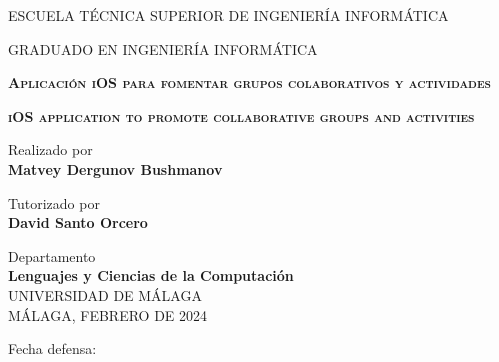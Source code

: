 \begin{titlepage}
    \selectfont
    
    \begin{center}
        {\large ESCUELA TÉCNICA SUPERIOR DE INGENIERÍA INFORMÁTICA}

        \vspace{0.1cm}
        {\large GRADUADO EN INGENIERÍA INFORMÁTICA}

        \vspace{2cm}
        \Large
        \textbf{\textsc{Aplicación iOS para fomentar grupos colaborativos y actividades}}
        \vspace{1cm}
        
        \Large
        \textbf{\textsc{iOS application to promote collaborative groups and activities}}

        \vspace{2cm}
        \large
        Realizado por\\
        \textbf{Matvey Dergunov Bushmanov}

        \vspace{1cm}
        \large
        Tutorizado por\\
        \textbf{David Santo Orcero}

        \vspace{1cm}
        \large
        Departamento\\
        \textbf{Lenguajes y Ciencias de la Computación}\\

        \vspace{2cm}
        \large
        UNIVERSIDAD DE MÁLAGA
        \\
        MÁLAGA, FEBRERO DE 2024
    \end{center}
    \begin{flushright}
        \vspace{1.5cm}
        Fecha defensa: 
    \end{flushright}
\end{titlepage}

\begingroup
    \pagestyle{empty}
    \cleardoublepage
\endgroup
